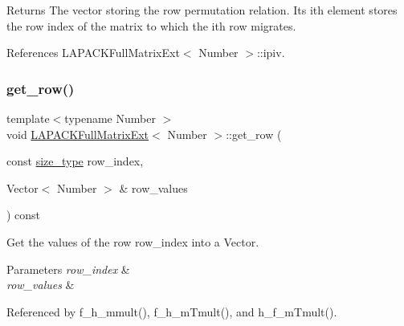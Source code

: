 \begin{DoxyReturn}{Returns}
The vector storing the row permutation relation. Its i\textquotesingle{}th element stores the row index of the matrix to which the i\textquotesingle{}th row migrates. 
\end{DoxyReturn}


References L\+A\+P\+A\+C\+K\+Full\+Matrix\+Ext$<$ Number $>$\+::ipiv.

\mbox{\label{classLAPACKFullMatrixExt_abc010374ccacc6d1e482196af807d247}} 
\subsubsection{\texorpdfstring{get\+\_\+row()}{get\_row()}}
{\footnotesize\ttfamily template$<$typename Number $>$ \\
void \hyperlink{classLAPACKFullMatrixExt}{L\+A\+P\+A\+C\+K\+Full\+Matrix\+Ext}$<$ Number $>$\+::get\+\_\+row (\begin{DoxyParamCaption}\item[{const \hyperlink{classLAPACKFullMatrixExt_a5cf5f4a6104dc17029210b5ca52bf574}{size\+\_\+type}}]{row\+\_\+index,  }\item[{Vector$<$ Number $>$ \&}]{row\+\_\+values }\end{DoxyParamCaption}) const}

Get the values of the row {\ttfamily row\+\_\+index} into a {\ttfamily Vector}. 
\begin{DoxyParams}{Parameters}
{\em row\+\_\+index} & \\
\hline
{\em row\+\_\+values} & \\
\hline
\end{DoxyParams}


Referenced by f\+\_\+h\+\_\+mmult(), f\+\_\+h\+\_\+m\+Tmult(), and h\+\_\+f\+\_\+m\+Tmult().

\mbox{\label{classLAPACKFullMatrixExt_aeeae2d2698007889a47f192043adb75c}} 
